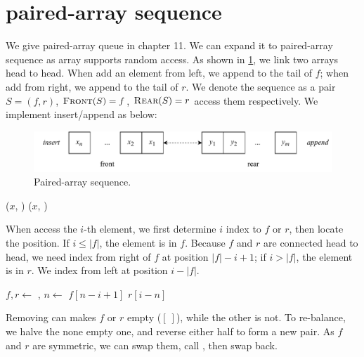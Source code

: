 \documentclass[b5paper]{article}
\begin{document}
\section{paired-array sequence}

We give paired-array queue in chapter 11. We can expand it to paired-array sequence as array supports random access. As shown in \cref{fig:parrays}, we link two arrays head to head. When add an element from left, we append to the tail of $f$; when add from right, we append to the tail of $r$. We denote the sequence as a pair $S = (f, r)$, $\textproc{Front}(S) = f$, $\textproc{Rear}(S) = r$ access them respectively. We implement insert/append as below:

\begin{figure}[htbp]
  \centering
  \includegraphics[scale=0.7]{img/parrays}
  \caption{Paired-array sequence.}
  \label{fig:parrays}
\end{figure}

\begin{algorithmic}[1]
  \State {}($x$, )
\EndFunction
{}
  \State {}($x$, )
\EndFunction
\end{algorithmic}


When access the $i$-th element, we first determine $i$ index to $f$ or $r$, then locate the position. If $ i \leq |f|$, the element is in $f$. Because $f$ and $r$ are connected head to head, we need index from right of $f$ at position $|f| - i + 1$; if $i > |f|$, the element is in $r$. We index from left at position $i - |f|$.

\begin{algorithmic}[1]
  \State $f, r \gets $ , 
  \State $n \gets $ 
    \State \Return $f[n - i + 1]$ 
  \Else
    \State \Return $r[i - n]$
  \EndIf
\EndFunction
\end{algorithmic}

Removing can makes $f$ or $r$ empty ($[\ ]$), while the other is not. To re-balance, we halve the none empty one, and reverse either half to form a new pair. As $f$ and $r$ are symmetric, we can swap them, call , then swap back.
\end{document}
